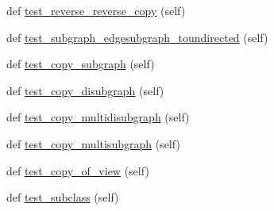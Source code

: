 \begin{DoxyCompactItemize}
def \hyperlink{classnetworkx_1_1classes_1_1tests_1_1test__graphviews_1_1TestChainsOfViews_ac7617f9114d24e87366a43a2e137dd7e}{test\+\_\+reverse\+\_\+reverse\+\_\+copy} (self)
\item 
def \hyperlink{classnetworkx_1_1classes_1_1tests_1_1test__graphviews_1_1TestChainsOfViews_ab189e1dc51484bde0de70cb05c6ff5dc}{test\+\_\+subgraph\+\_\+edgesubgraph\+\_\+toundirected} (self)
\item 
def \hyperlink{classnetworkx_1_1classes_1_1tests_1_1test__graphviews_1_1TestChainsOfViews_ae45c6bc05ab3cdc7bbfaadf21d221cf7}{test\+\_\+copy\+\_\+subgraph} (self)
\item 
def \hyperlink{classnetworkx_1_1classes_1_1tests_1_1test__graphviews_1_1TestChainsOfViews_ab92e8031fd4720c3b921dfdefa137733}{test\+\_\+copy\+\_\+disubgraph} (self)
\item 
def \hyperlink{classnetworkx_1_1classes_1_1tests_1_1test__graphviews_1_1TestChainsOfViews_a91debe5d544d32003cdc226aaf496809}{test\+\_\+copy\+\_\+multidisubgraph} (self)
\item 
def \hyperlink{classnetworkx_1_1classes_1_1tests_1_1test__graphviews_1_1TestChainsOfViews_a504ae42948bea9be126f3fc55134143b}{test\+\_\+copy\+\_\+multisubgraph} (self)
\item 
def \hyperlink{classnetworkx_1_1classes_1_1tests_1_1test__graphviews_1_1TestChainsOfViews_a16981c0544e673a0b6e103eac9e83b29}{test\+\_\+copy\+\_\+of\+\_\+view} (self)
\item 
def \hyperlink{classnetworkx_1_1classes_1_1tests_1_1test__graphviews_1_1TestChainsOfViews_a06cd58031494f082b08d13f9dc171f4d}{test\+\_\+subclass} (self)
\end{DoxyCompactItemize}
